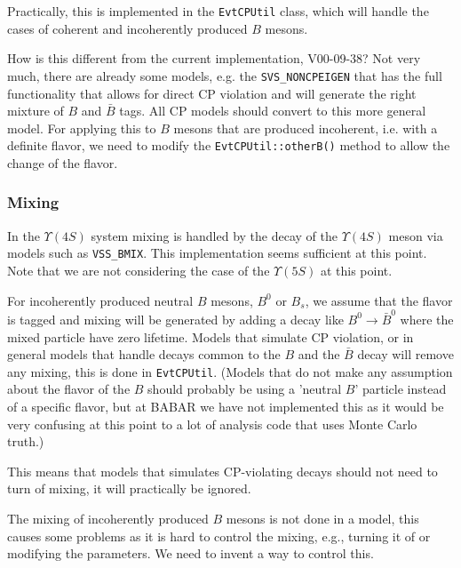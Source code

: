 Practically, this is implemented in the {\tt EvtCPUtil}
class, which will handle the cases of coherent and incoherently
produced $B$ mesons.

How is this different from the current implementation, V00-09-38?
Not very much, there are already some models, e.g. the 
{\tt SVS\_NONCPEIGEN}
that has the full functionality that allows for direct CP violation 
and will generate the right mixture of $B$ and $\bar B$ tags.
All CP models should convert to this more general model. For 
applying this to $B$ mesons that are produced incoherent, i.e.
with a definite flavor, we need to modify the {\tt EvtCPUtil::otherB()}
method to allow the change of the flavor.

\subsubsection{Mixing}

In the $\Upsilon(4S)$ system mixing is handled by the decay of the
$\Upsilon(4S)$ meson via models such as {\tt VSS\_BMIX}. This 
implementation seems sufficient at this point. Note that we
are not considering the case of the $\Upsilon(5S)$ at this point.

For incoherently produced neutral $B$ mesons, $B^0$ or $B_s$, we assume that
the flavor is tagged and mixing will be generated by adding a 
decay like $B^0\to \bar B^0$ where the mixed particle have 
zero lifetime. Models that simulate CP violation, or in general
models that handle decays common to the $B$ and the $\bar B$ 
decay will remove any mixing, this is done in {\tt EvtCPUtil}. 
(Models that do not make any assumption about
the flavor of the $B$ should probably be using a 'neutral $B$' particle
instead of a specific flavor, but at BABAR we have not implemented 
this as it would be very confusing at this point to a lot of
analysis code that uses Monte Carlo truth.)

This means that models that simulates CP-violating decays should not
need to turn of mixing, it will practically be ignored. 

The mixing of incoherently produced  $B$ mesons is not done in a 
model, this causes some problems as it is hard to control the
mixing, e.g., turning it of or modifying the parameters. We need to
invent a way to control this.


